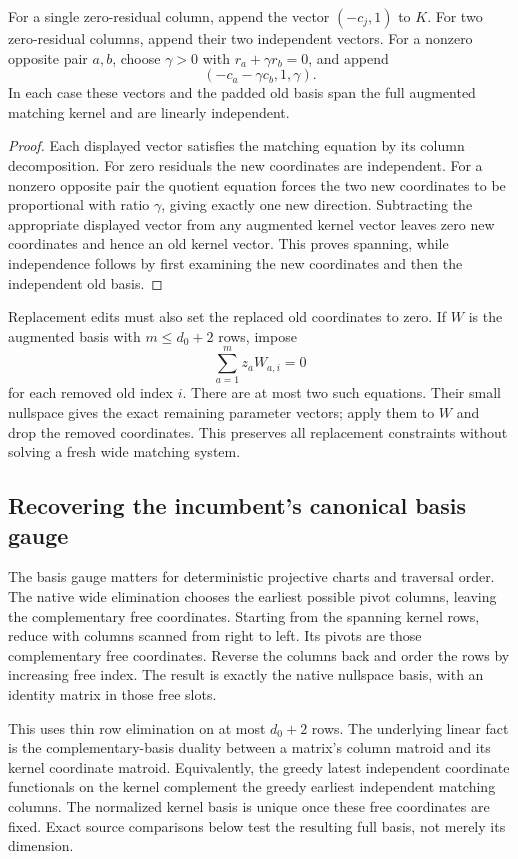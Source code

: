 \begin{proposition}
For a single zero-residual column, append the vector $(-c_j,1)$ to $K$.
For two zero-residual columns, append their two independent vectors.
For a nonzero opposite pair $a,b$, choose $\gamma>0$ with
$r_a+\gamma r_b=0$, and append
\[
                    (-c_a-\gamma c_b,1,\gamma).
\]
In each case these vectors and the padded old basis span the full augmented
matching kernel and are linearly independent.
\end{proposition}
\begin{proof}
Each displayed vector satisfies the matching equation by its column
decomposition. For zero residuals the new coordinates are independent.
For a nonzero opposite pair the quotient equation forces the two new
coordinates to be proportional with ratio $\gamma$, giving exactly one
new direction. Subtracting the appropriate displayed vector from any
augmented kernel vector leaves zero new coordinates and hence an old
kernel vector. This proves spanning, while independence follows by first
examining the new coordinates and then the independent old basis.
\end{proof}

Replacement edits must also set the replaced old coordinates to zero.
If $W$ is the augmented basis with $m\le d_0+2$ rows, impose
\[
                    \sum_{a=1}^m z_aW_{a,i}=0
\]
for each removed old index $i$. There are at most two such equations.
Their small nullspace gives the exact remaining parameter vectors; apply
them to $W$ and drop the removed coordinates. This preserves all replacement
constraints without solving a fresh wide matching system.

\subsection{Recovering the incumbent's canonical basis gauge}

The basis gauge matters for deterministic projective charts and traversal
order. The native wide elimination chooses the earliest possible pivot
columns, leaving the complementary free coordinates. Starting from the
spanning kernel rows, reduce with columns scanned from right to left.
Its pivots are those complementary free coordinates. Reverse the columns
back and order the rows by increasing free index. The result is exactly
the native nullspace basis, with an identity matrix in those free slots.

This uses thin row elimination on at most $d_0+2$ rows. The underlying
linear fact is the complementary-basis duality between a matrix's column
matroid and its kernel coordinate matroid. Equivalently, the greedy latest
independent coordinate functionals on the kernel complement the greedy
earliest independent matching columns. The normalized kernel basis is
unique once these free coordinates are fixed. Exact source comparisons
below test the resulting full basis, not merely its dimension.

